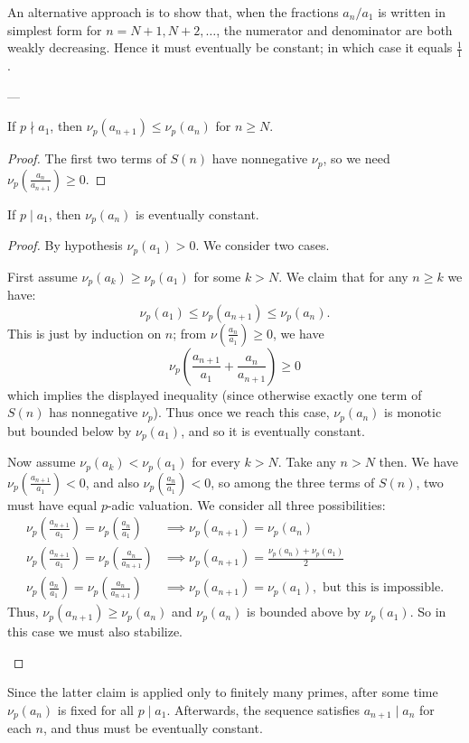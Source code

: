 \begin{remark*}
  An alternative approach is to show that, when the fractions $a_n / a_1$
  is written in simplest form for $n = N+1, N+2, \dots$,
  the numerator and denominator are both weakly decreasing.
  Hence it must eventually be constant; in which case it equals $\frac11$.
\end{remark*}

---


\begin{claim*}
  If $p \nmid a_1$, then $\nu_p(a_{n+1}) \le \nu_p(a_n)$ for $n \ge N$.
\end{claim*}
\begin{proof}
  The first two terms of $S(n)$ have nonnegative $\nu_p$,
  so we need $\nu_p(\frac{a_n}{a_{n+1}}) \ge 0$.
\end{proof}

\begin{claim*}
  If $p \mid a_1$, then $\nu_p(a_n)$ is eventually constant.
\end{claim*}
\begin{proof}
  By hypothesis $\nu_p(a_1) > 0$.
  We consider two cases.
  \begin{itemize}
    \ii First assume $\nu_p(a_k) \ge \nu_p(a_1)$ for some $k > N$.
    We claim that for any $n \ge k$ we have:
    \[ \nu_p(a_1) \le \nu_p(a_{n+1}) \le \nu_p(a_n). \]
    This is just by induction on $n$;
    from $\nu(\frac{a_n}{a_1}) \ge 0$, we have
    \[ \nu_p\left( \frac{a_{n+1}}{a_1} + \frac{a_n}{a_{n+1}} \right) \ge 0 \]
    which implies the displayed inequality
    (since otherwise exactly one term of $S(n)$ has nonnegative $\nu_p$).
    Thus once we reach this case, $\nu_p(a_n)$ is monotic but bounded below by
    $\nu_p(a_1)$, and so it is eventually constant.

    \ii Now assume $\nu_p(a_k) < \nu_p(a_1)$ for every $k > N$.
    Take any $n > N$ then.
    We have $\nu_p\left(\frac{a_{n+1}}{a_1}\right) < 0$,
    and also $\nu_p\left(\frac{a_n}{a_1}\right) < 0$,
    so among the three terms of $S(n)$,
    two must have equal $p$-adic valuation.
    We consider all three possibilities:
    \begin{align*}
      \nu_p\left(\frac{a_{n+1}}{a_1}\right) = \nu_p\left(\frac{a_n}{a_1}\right)
      &\implies \boxed{\nu_p(a_{n+1}) = \nu_p(a_{n})} \\
      \nu_p\left(\frac{a_{n+1}}{a_1}\right) = \nu_p\left(\frac{a_n}{a_{n+1}}\right)
      &\implies \boxed{\nu_p(a_{n+1}) = \frac{\nu_p(a_n) + \nu_p(a_1)}{2}} \\
      \nu_p\left(\frac{a_{n}}{a_1}\right) = \nu_p\left(\frac{a_n}{a_{n+1}}\right)
      &\implies \nu_p(a_{n+1}) = \nu_p(a_1),\text{ but this is impossible}.
    \end{align*}
    Thus, $\nu_p(a_{n+1}) \ge \nu_p(a_n)$
    and $\nu_p(a_n)$ is bounded above by $\nu_p(a_1)$.
    So in this case we must also stabilize. \qedhere
  \end{itemize}
\end{proof}

Since the latter claim is applied only to finitely many primes,
after some time $\nu_p(a_n)$ is fixed for all $p \mid a_1$.
Afterwards, the sequence satisfies $a_{n+1} \mid a_n$ for each $n$,
and thus must be eventually constant.
